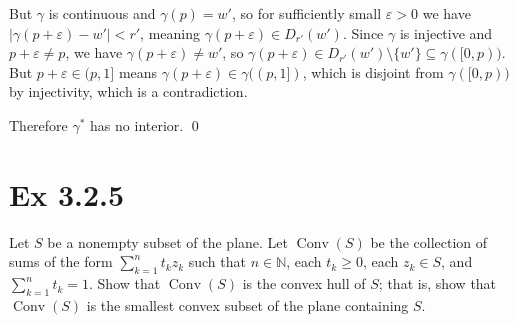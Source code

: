 \documentclass[a4paper]{article}
\begin{document}
\medskip
But $\gamma$ is continuous and $\gamma(p) = w'$, so for sufficiently small $\varepsilon > 0$ we have $|\gamma(p + \varepsilon) - w'| < r'$, meaning $\gamma(p + \varepsilon) \in D_{r'}(w')$. Since $\gamma$ is injective and $p + \varepsilon \neq p$, we have $\gamma(p + \varepsilon) \neq w'$, so $\gamma(p + \varepsilon) \in D_{r'}(w') \setminus \{w'\} \subseteq \gamma([0,p))$. But $p + \varepsilon \in (p,1]$ means $\gamma(p + \varepsilon) \in \gamma((p,1])$, which is disjoint from $\gamma([0,p))$ by injectivity, which is a contradiction.

Therefore $\gamma^*$ has no interior. \qed

\newpage

\section*{Ex 3.2.5}

\begin{tcolorbox}[colback=gray!10, colframe=black, boxrule=0.5pt, arc=2mm]
Let $S$ be a nonempty subset of the plane. Let $\operatorname{Conv}(S)$ be the collection of sums of the form $\sum_{k=1}^{n} t_k z_k$ such that $n \in \mathbb{N}$, each $t_k \geq 0$, each $z_k \in S$, and $\sum_{k=1}^{n} t_k = 1$. Show that $\operatorname{Conv}(S)$ is the convex hull of $S$; that is, show that $\operatorname{Conv}(S)$ is the smallest convex subset of the plane containing $S$.
\end{tcolorbox}
\end{document}
